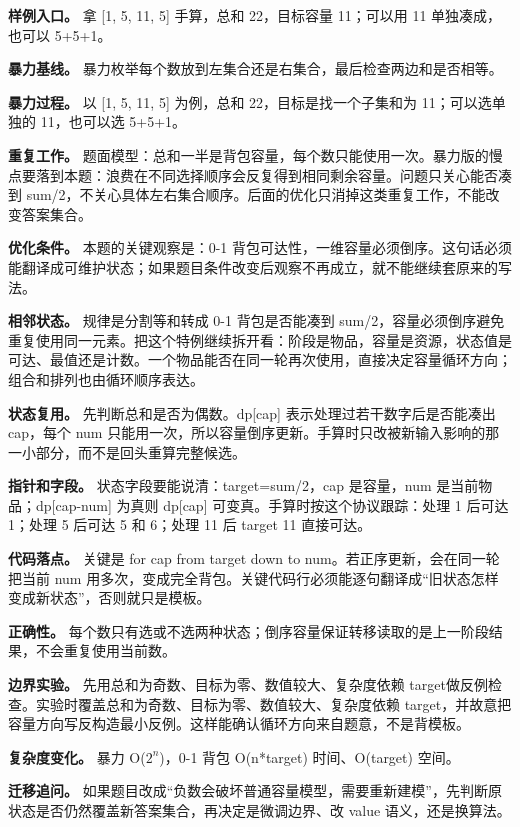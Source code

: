 \textbf{样例入口。} 拿 [1, 5, 11, 5] 手算，总和 22，目标容量 11；可以用 11 单独凑成，也可以 5+5+1。

\textbf{暴力基线。} 暴力枚举每个数放到左集合还是右集合，最后检查两边和是否相等。

\textbf{暴力过程。} 以 [1, 5, 11, 5] 为例，总和 22，目标是找一个子集和为 11；可以选单独的 11，也可以选 5+5+1。

\textbf{重复工作。} 题面模型：总和一半是背包容量，每个数只能使用一次。暴力版的慢点要落到本题：浪费在不同选择顺序会反复得到相同剩余容量。问题只关心能否凑到 sum/2，不关心具体左右集合顺序。后面的优化只消掉这类重复工作，不能改变答案集合。

\textbf{优化条件。} 本题的关键观察是：0-1 背包可达性，一维容量必须倒序。这句话必须能翻译成可维护状态；如果题目条件改变后观察不再成立，就不能继续套原来的写法。

\textbf{相邻状态。} 规律是分割等和转成 0-1 背包是否能凑到 sum/2，容量必须倒序避免重复使用同一元素。把这个特例继续拆开看：阶段是物品，容量是资源，状态值是可达、最值还是计数。一个物品能否在同一轮再次使用，直接决定容量循环方向；组合和排列也由循环顺序表达。

\textbf{状态复用。} 先判断总和是否为偶数。dp[cap] 表示处理过若干数字后是否能凑出 cap，每个 num 只能用一次，所以容量倒序更新。手算时只改被新输入影响的那一小部分，而不是回头重算完整候选。

\textbf{指针和字段。} 状态字段要能说清：target=sum/2，cap 是容量，num 是当前物品；dp[cap-num] 为真则 dp[cap] 可变真。手算时按这个协议跟踪：处理 1 后可达 1；处理 5 后可达 5 和 6；处理 11 后 target 11 直接可达。

\textbf{代码落点。} 关键是 for cap from target down to num。若正序更新，会在同一轮把当前 num 用多次，变成完全背包。关键代码行必须能逐句翻译成“旧状态怎样变成新状态”，否则就只是模板。

\textbf{正确性。} 每个数只有选或不选两种状态；倒序容量保证转移读取的是上一阶段结果，不会重复使用当前数。

\textbf{边界实验。} 先用总和为奇数、目标为零、数值较大、复杂度依赖 target做反例检查。实验时覆盖总和为奇数、目标为零、数值较大、复杂度依赖 target，并故意把容量方向写反构造最小反例。这样能确认循环方向来自题意，不是背模板。

\textbf{复杂度变化。} 暴力 O(\ensuremath{2^{n}})，0-1 背包 O(n*target) 时间、O(target) 空间。

\textbf{迁移追问。} 如果题目改成“负数会破坏普通容量模型，需要重新建模”，先判断原状态是否仍然覆盖新答案集合，再决定是微调边界、改 value 语义，还是换算法。

